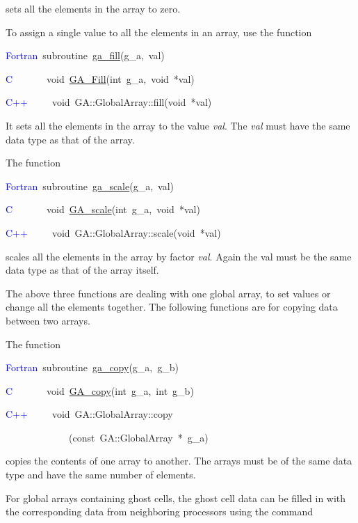 sets all the elements in the array to zero.

To assign a single value to all the elements in an array, use the
function

\textcolor{blue}{Fortran}~subroutine~\href{https://hpc.pnl.gov/globalarrays/api/f_op_api.html\#ga_fill}{ga\_{}fill}(g\_a,~val)~

\textcolor{blue}{C}~~~~~~~void~\href{https://hpc.pnl.gov/globalarrays/api/c_op_api.html\#ga_fill}{GA\_{}Fill}(int~g\_a,~void~{*}val)~

\textcolor{blue}{C++}~~~~~void~GA::GlobalArray::fill(void~{*}val)


It sets all the elements in the array to the value \emph{val}. The
\emph{val} must have the same data type as that of the array.

The function

\textcolor{blue}{Fortran}~subroutine~\href{https://hpc.pnl.gov/globalarrays/api/f_op_api.html\#ga_scale}{ga\_{}scale}(g\_a,~val)~

\textcolor{blue}{C}~~~~~~~void~\href{https://hpc.pnl.gov/globalarrays/api/c_op_api.html\#ga_scale}{GA\_{}scale}(int~g\_a,~void~{*}val)~

\textcolor{blue}{C++}~~~~~void~GA::GlobalArray::scale(void~{*}val)

scales all the elements in the array by factor \emph{val}. Again the
val must be the same data type as that of the array itself.

The above three functions are dealing with one global array, to set
values or change all the elements together. The following functions
are for copying data between two arrays.

The function

\textcolor{blue}{Fortran}~subroutine~\href{https://hpc.pnl.gov/globalarrays/api/f_op_api.html\#ga_copy}{ga\_{}copy}(g\_a,~g\_b)~

\textcolor{blue}{C}~~~~~~~void~\href{https://hpc.pnl.gov/globalarrays/api/c_op_api.html\#ga_copy}{GA\_{}copy}(int~g\_a,~int~g\_b)~

\textcolor{blue}{C++}~~~~~void~GA::GlobalArray::copy

~~~~~~~~~~~~~(const~GA::GlobalArray~{*}~g\_a)

copies the contents of one array to another. The arrays must be of
the same data type and have the same number of elements.

For global arrays containing ghost cells, the ghost cell data can
be filled in with the corresponding data from neighboring processors
using the command

